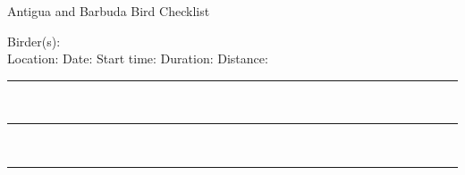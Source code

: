\documentclass{article}
\newcommand{\newnoteline}{\rule{\textwidth}{0.15mm}\\[1.5ex]}
\begin{document}
\centering
\LARGE{Antigua and Barbuda Bird Checklist}\\
\normalsize \raggedright


Birder(s): \underline{\hspace{112ex}}\\[1.5ex]
Location: \underline{\hspace{28ex}}    Date: \underline{\hspace{13ex}}    Start time: \underline{\hspace{10ex}}   Duration: \underline{\hspace{10ex}}    Distance: \underline{\hspace{10ex}}\\[1.5ex]


\newnoteline\newnoteline\newnoteline


\begin{center}


\end{center}
\end{document}

